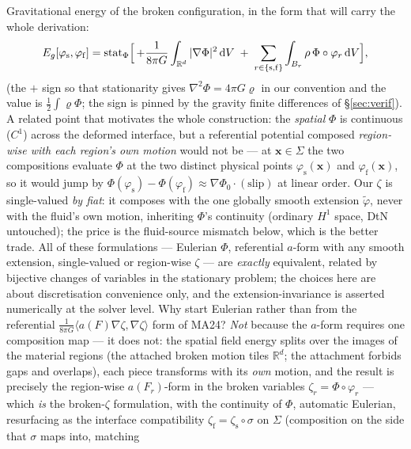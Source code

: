 \documentclass[11pt]{article}
\newcommand{\R}{\mathbb{R}}
\newcommand{\bx}{\mathbf{x}}
\newcommand{\dV}{\,\mathrm{d}V}
\begin{document}
Gravitational energy of the broken configuration, in the form that will
carry the whole derivation:
\begin{equation}
  E_g[\varphi_{\mathrm{s}}, \varphi_{\mathrm{f}}]
  = \operatorname{stat}_{\Phi}
    \Bigl[\, +\frac{1}{8\pi G}\int_{\R^d} |\nabla\Phi|^2 \dV
    \;+\; \sum_{r \in \{\mathrm{s,f}\}} \int_{B_r} \rho\,
          \Phi\circ\varphi_r \dV \Bigr],
  \label{eq:Eg}
\end{equation}
(the $+$ sign so that stationarity gives $\nabla^2\Phi = 4\pi G\varrho$
in our convention and the value is $\tfrac12\int\varrho\Phi$; the
sign is pinned by the gravity finite differences of \S\ref{sec:verif}).
A related point that motivates the whole construction: the
\emph{spatial} $\Phi$ is continuous ($C^1$) across the deformed
interface, but a referential potential composed \emph{region-wise with
each region's own motion} would not be --- at $\bx \in \Sigma$ the two
compositions evaluate $\Phi$ at the two distinct physical points
$\varphi_{\mathrm{s}}(\bx)$ and $\varphi_{\mathrm{f}}(\bx)$, so it
would jump by $\Phi(\varphi_{\mathrm{s}}) - \Phi(\varphi_{\mathrm{f}})
\approx \nabla\Phi_0\cdot(\text{slip})$ at linear order. Our $\zeta$
is single-valued \emph{by fiat}: it composes with the one globally
smooth extension $\tilde\varphi$, never with the fluid's own motion,
inheriting $\Phi$'s continuity (ordinary $H^1$ space, DtN untouched);
the price is the fluid-source mismatch below, which is the better
trade. All of these formulations --- Eulerian $\Phi$, referential
$a$-form with any smooth extension, single-valued or region-wise
$\zeta$ --- are \emph{exactly} equivalent, related by bijective changes
of variables in the stationary problem; the choices here are about
discretisation convenience only, and the extension-invariance is
asserted numerically at the solver level. Why start Eulerian rather than from the referential
$\tfrac{1}{8\pi G}\langle a(F)\nabla\zeta, \nabla\zeta\rangle$ form of
MA24? \emph{Not} because the $a$-form requires one composition map ---
it does not: the spatial field energy splits over the images of the
material regions (the attached broken motion tiles $\R^d$; the
attachment forbids gaps and overlaps), each piece transforms with its
\emph{own} motion, and the result is precisely the region-wise
$a(F_r)$-form in the broken variables $\zeta_r = \Phi\circ\varphi_r$
--- which \emph{is} the broken-$\zeta$ formulation, with the
continuity of $\Phi$, automatic Eulerian, resurfacing as the interface
compatibility $\zeta_{\mathrm{f}} = \zeta_{\mathrm{s}}\circ\sigma$ on
$\Sigma$ (composition on the side that $\sigma$ maps into, matching
\end{document}
